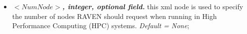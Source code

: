 \begin{itemize}

\item $<NumNode>$\textbf{\textit{, integer, optional field.}}  this xml node is used to specify the number of nodes RAVEN should request when running in High Performance Computing (HPC) systems. \textit{Default = None};


\end{itemize}
